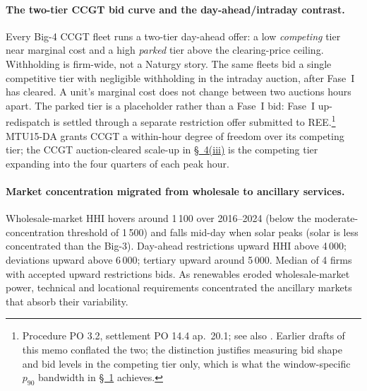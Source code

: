 \documentclass[11pt]{article}
\begin{document}
\paragraph{The two-tier CCGT bid curve and the day-ahead/intraday contrast.} Every Big-4 CCGT fleet runs a two-tier day-ahead offer: a low \emph{competing} tier near marginal cost and a high \emph{parked} tier above the clearing-price ceiling. Withholding is firm-wide, not a Naturgy story. The same fleets bid a single competitive tier with negligible withholding in the intraday auction, after Fase~I has cleared. A unit's marginal cost does not change between two auctions hours apart. The parked tier is a placeholder rather than a Fase~I bid: Fase~I up-redispatch is settled through a separate restriction offer submitted to REE.\footnote{Procedure PO 3.2, settlement PO 14.4 ap.~20.1; see also \citet{boe_a_2025_5342,boe_a_2025_13076}. Earlier drafts of this memo conflated the two; the distinction justifies measuring bid shape and bid levels in the competing tier only, which is what the window-specific $p_{90}$ bandwidth in \hyperref[sec:setup]{\S~1} achieves.} MTU15-DA grants CCGT a within-hour degree of freedom over its competing tier; the CCGT auction-cleared scale-up in \hyperref[sec:4iii]{\S~4(iii)} is the competing tier expanding into the four quarters of each peak hour.

\paragraph{Market concentration migrated from wholesale to ancillary services.} Wholesale-market HHI hovers around 1\,100 over 2016--2024 (below the moderate-concentration threshold of 1\,500) and falls mid-day when solar peaks (solar is less concentrated than the Big-3). Day-ahead restrictions upward HHI above 4\,000; deviations upward above 6\,000; tertiary upward around 5\,000. Median of 4 firms with accepted upward restrictions bids. As renewables eroded wholesale-market power, technical and locational requirements concentrated the ancillary markets that absorb their variability.

\vspace{20pt}



\end{document}
